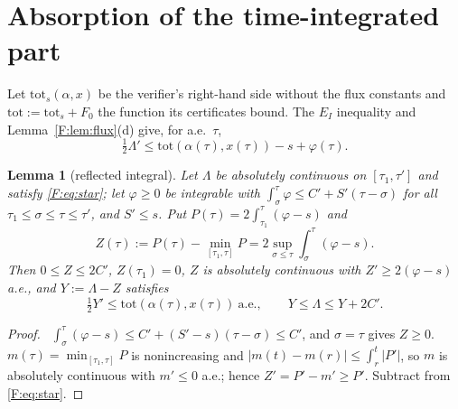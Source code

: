 \documentclass[11pt]{article}
\newtheorem{lemma}{Lemma}\newtheorem{proposition}{Proposition}\newtheorem{remark}{Remark}
\begin{document}
\section{Absorption of the time-integrated part}\label{F:sec:abs}
Let $\mathrm{tot}_s(\alpha,x)$ be the verifier's right-hand side without the flux constants and $\mathrm{tot}:=\mathrm{tot}_s+F_0$ the function its certificates bound. The $E_I$ inequality and Lemma~\ref{F:lem:flux}(d) give, for a.e.\ $\tau$,
\begin{equation}\label{F:eq:star}
\tfrac12\Lambda'\le\mathrm{tot}(\alpha(\tau),x(\tau))-s+\varphi(\tau).
\end{equation}

\begin{lemma}[reflected integral]\label{F:lem:Z}
Let $\Lambda$ be absolutely continuous on $[\tau_1,\tau']$ and satisfy \eqref{F:eq:star}; let $\varphi\ge0$ be integrable with $\int_\sigma^\tau\varphi\le C'+S'(\tau-\sigma)$ for all $\tau_1\le\sigma\le\tau\le\tau'$, and $S'\le s$. Put $P(\tau)=2\int_{\tau_1}^\tau(\varphi-s)$ and
\[Z(\tau):=P(\tau)-\min_{[\tau_1,\tau]}P=2\sup_{\sigma\le\tau}\int_\sigma^\tau(\varphi-s).\]
Then $0\le Z\le2C'$, $Z(\tau_1)=0$, $Z$ is absolutely continuous with $Z'\ge2(\varphi-s)$ a.e., and $Y:=\Lambda-Z$ satisfies
\[\tfrac12Y'\le\mathrm{tot}(\alpha(\tau),x(\tau))\ \text{a.e.},\qquad Y\le\Lambda\le Y+2C' .\]
\end{lemma}
\begin{proof}\tH\ $\int_\sigma^\tau(\varphi-s)\le C'+(S'-s)(\tau-\sigma)\le C'$, and $\sigma=\tau$ gives $Z\ge0$. $m(\tau)=\min_{[\tau_1,\tau]}P$ is nonincreasing and $|m(t)-m(r)|\le\int_r^t|P'|$, so $m$ is absolutely continuous with $m'\le0$ a.e.; hence $Z'=P'-m'\ge P'$. Subtract from \eqref{F:eq:star}.
\end{proof}
\end{document}
